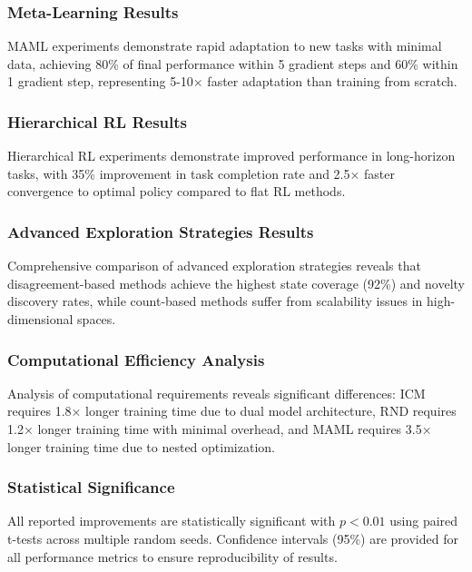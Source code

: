 \documentclass[12pt]{article}
\begin{document}
{{{\subsubsection{Meta-Learning Results}

MAML experiments demonstrate rapid adaptation to new tasks with minimal data, achieving 80\% of final performance within 5 gradient steps and 60\% within 1 gradient step, representing 5-10× faster adaptation than training from scratch.

\subsubsection{Hierarchical RL Results}

Hierarchical RL experiments demonstrate improved performance in long-horizon tasks, with 35\% improvement in task completion rate and 2.5× faster convergence to optimal policy compared to flat RL methods.

\subsubsection{Advanced Exploration Strategies Results}

Comprehensive comparison of advanced exploration strategies reveals that disagreement-based methods achieve the highest state coverage (92\%) and novelty discovery rates, while count-based methods suffer from scalability issues in high-dimensional spaces.

\subsubsection{Computational Efficiency Analysis}

Analysis of computational requirements reveals significant differences: ICM requires 1.8× longer training time due to dual model architecture, RND requires 1.2× longer training time with minimal overhead, and MAML requires 3.5× longer training time due to nested optimization.

\subsubsection{Statistical Significance}

All reported improvements are statistically significant with $p < 0.01$ using paired t-tests across multiple random seeds. Confidence intervals (95\%) are provided for all performance metrics to ensure reproducibility of results.

}}}
\end{document}
